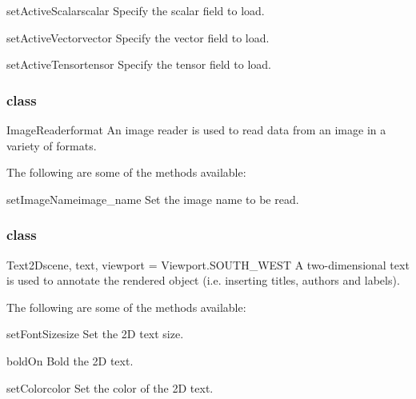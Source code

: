 \begin{methoddesc}[DataCollector]{setActiveScalar}{scalar}
Specify the scalar field to load.
\end{methoddesc}

\begin{methoddesc}[DataCollector]{setActiveVector}{vector}
Specify the vector field to load.
\end{methoddesc}

\begin{methoddesc}[DataCollector]{setActiveTensor}{tensor}
Specify the tensor field to load.
\end{methoddesc}

\subsubsection{\ImageReader class}

\begin{classdesc}{ImageReader}{format}
An image reader is used to read data from an image in a variety of formats.
\end{classdesc}

The following are some of the methods available:
\begin{methoddesc}[ImageReader]{setImageName}{image_name}
Set the image name to be read.
\end{methoddesc}

\subsubsection{\TextTwoD class}

\begin{classdesc}{Text2D}{scene, text, viewport = Viewport.SOUTH_WEST}
A two-dimensional text is used to annotate the rendered object 
(i.e. inserting titles, authors and labels).
\end{classdesc}

The following are some of the methods available:
\begin{methoddesc}[Text2D]{setFontSize}{size}
Set the 2D text size.
\end{methoddesc}

\begin{methoddesc}[Text2D]{boldOn}{}
Bold the 2D text.
\end{methoddesc}

\begin{methoddesc}[Text2D]{setColor}{color}
Set the color of the 2D text.
\end{methoddesc}

